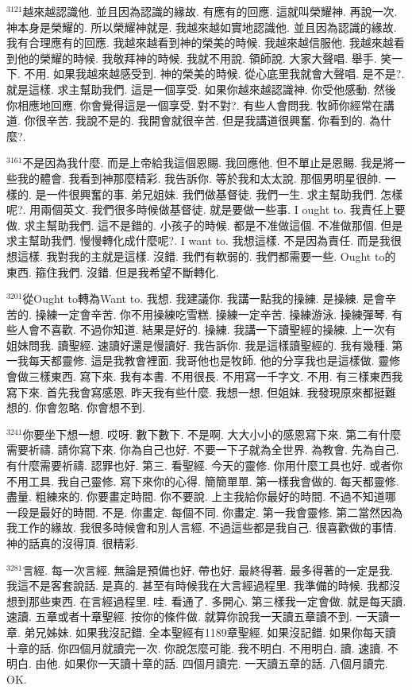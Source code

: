\documentclass{book}
\begin{document}
$^{3121}$越來越認識他.
並且因為認識的緣故.
有應有的回應.
這就叫榮耀神.
再說一次.
神本身是榮耀的.
所以榮耀神就是.
我越來越如實地認識他.
並且因為認識的緣故.
我有合理應有的回應.
我越來越看到神的榮美的時候.
我越來越信服他.
我越來越看到他的榮耀的時候.
我敬拜神的時候.
我就不用說.
領師說.
大家大聲唱.
舉手.
笑一下.
不用.
如果我越來越感受到.
神的榮美的時候.
從心底里我就會大聲唱.
是不是?.
就是這樣.
求主幫助我們.
這是一個享受.
如果你越來越認識神.
你受他感動.
然後你相應地回應.
你會覺得這是一個享受.
對不對?.
有些人會問我.
牧師你經常在講道.
你很辛苦.
我說不是的.
我開會就很辛苦.
但是我講道很興奮.
你看到的.
為什麼?.

$^{3161}$不是因為我什麼.
而是上帝給我這個恩賜.
我回應他.
但不單止是恩賜.
我是將一些我的體會.
我看到神那麼精彩.
我告訴你.
等於我和太太說.
那個男明星很帥.
一樣的.
是一件很興奮的事.
弟兄姐妹.
我們做基督徒.
我們一生.
求主幫助我們.
怎樣呢?.
用兩個英文.
我們很多時候做基督徒.
就是要做一些事.
I ought to.
我責任上要做.
求主幫助我們.
這不是錯的.
小孩子的時候.
都是不准做這個.
不准做那個.
但是求主幫助我們.
慢慢轉化成什麼呢?.
I want to.
我想這樣.
不是因為責任.
而是我很想這樣.
我對我的主就是這樣.
沒錯.
我們有軟弱的.
我們都需要一些.
Ought to的東西.
箍住我們.
沒錯.
但是我希望不斷轉化.

$^{3201}$從Ought to轉為Want to.
我想.
我建議你.
我講一點我的操練.
是操練.
是會辛苦的.
操練一定會辛苦.
你不用操練吃雪糕.
操練一定辛苦.
操練游泳.
操練彈琴.
有些人會不喜歡.
不過你知道.
結果是好的.
操練.
我講一下讀聖經的操練.
上一次有姐妹問我.
讀聖經.
速讀好還是慢讀好.
我告訴你.
我是這樣讀聖經的.
我有幾種.
第一我每天都靈修.
這是我教會裡面.
我哥他也是牧師.
他的分享我也是這樣做.
靈修會做三樣東西.
寫下來.
我有本書.
不用很長.
不用寫一千字文.
不用.
有三樣東西我寫下來.
首先我會寫感恩.
昨天我有些什麼.
我想一想.
但姐妹.
我發現原來都挺難想的.
你會忽略.
你會想不到.

$^{3241}$你要坐下想一想.
哎呀.
數下數下.
不是啊.
大大小小的感恩寫下來.
第二有什麼需要祈禱.
請你寫下來.
你為自己也好.
不要一下子就為全世界.
為教會.
先為自己.
有什麼需要祈禱.
認罪也好.
第三.
看聖經.
今天的靈修.
你用什麼工具也好.
或者你不用工具.
我自己靈修.
寫下來你的心得.
簡簡單單.
第一樣我會做的.
每天都靈修.
盡量.
粗練來的.
你要畫定時間.
你不要說.
上主我給你最好的時間.
不過不知道哪一段是最好的時間.
不是.
你畫定.
每個不同.
你畫定.
第一我會靈修.
第二當然因為我工作的緣故.
我很多時候會和別人言經.
不過這些都是我自己.
很喜歡做的事情.
神的話真的沒得頂.
很精彩.

$^{3281}$言經.
每一次言經.
無論是預備也好.
帶也好.
最終得著.
最多得著的一定是我.
我這不是客套說話.
是真的.
甚至有時候我在大言經過程里.
我準備的時候.
我都沒想到那些東西.
在言經過程里.
哇.
看通了.
多開心.
第三樣我一定會做.
就是每天讀.
速讀.
五章或者十章聖經.
按你的條件做.
就算你說我一天讀五章讀不到.
一天讀一章.
弟兄姊妹.
如果我沒記錯.
全本聖經有1189章聖經.
如果沒記錯.
如果你每天讀十章的話.
你四個月就讀完一次.
你說怎麼可能.
我不明白.
不用明白.
讀.
速讀.
不明白.
由他.
如果你一天讀十章的話.
四個月讀完.
一天讀五章的話.
八個月讀完.
OK.
\end{document}
